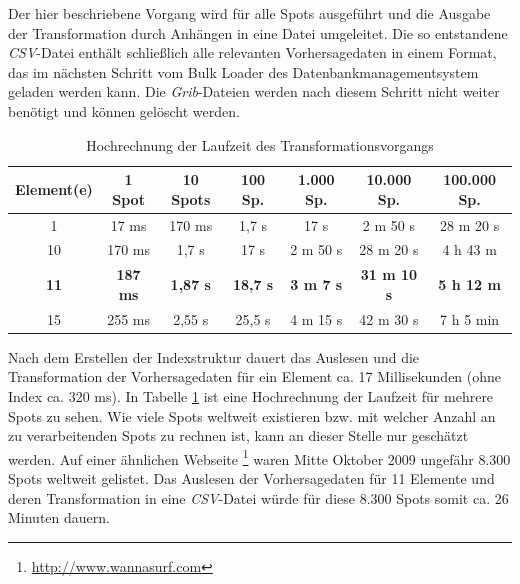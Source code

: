 

Der hier beschriebene Vorgang wird für alle Spots ausgeführt und die
Ausgabe der Transformation durch Anhängen in eine Datei
umgeleitet. Die so entstandene \textit{CSV}-Datei enthält schließlich
alle relevanten Vorhersagedaten in einem Format, das im nächsten
Schritt vom Bulk Loader des Datenbankmanagementsystem geladen werden
kann. Die \textit{Grib}-Dateien werden nach diesem Schritt nicht
weiter benötigt und können gelöscht werden.
\begin{table}[h]
  \centering
  {\sf
    \footnotesize
    \begin{longtable}{c|c|c|c|c|c|c}

      \toprule
      \textbf{Element(e)} & \textbf{1 Spot} & \textbf{10 Spots} & \textbf{100 Sp.} & \textbf{1.000 Sp.} & \textbf{10.000 Sp.} & \textbf{100.000 Sp.} \\
      \midrule
      1 & 17 ms & 170 ms & 1,7 s & 17 s & 2 m 50 s & 28 m 20 s \\
      10 & 170 ms & 1,7 s & 17 s & 2 m 50 s & 28 m 20 s & 4 h 43 m \\
      \textbf{11} & \textbf{187 ms} &  \textbf{1,87 s} & \textbf{18,7 s} & \textbf{3 m 7 s} & \textbf{31 m 10 s} & \textbf{5 h 12 m} \\
      15 & 255 ms & 2,55 s & 25,5 s & 4 m 15 s & 42 m 30 s &  7 h 5 min\\
      \bottomrule
    \end{longtable}
  }

  \caption{Hochrechnung der Laufzeit des Transformationsvorgangs}
  \label{tab:transformation_laufzeit}

\end{table}

Nach dem Erstellen der Indexstruktur dauert das Auslesen und die
Transformation der Vorhersagedaten für ein Element ca. 17
Millisekunden (ohne Index ca. 320 ms). In Tabelle
\ref{tab:transformation_laufzeit} ist eine Hochrechnung der Laufzeit
für mehrere Spots zu sehen. Wie viele Spots weltweit existieren
bzw. mit welcher Anzahl an zu verarbeitenden Spots zu rechnen ist,
kann an dieser Stelle nur geschätzt werden. Auf einer ähnlichen
Webseite \footnote{\url{http://www.wannasurf.com}} waren Mitte Oktober
2009 ungefähr 8.300 Spots weltweit gelistet. Das Auslesen der
Vorhersagedaten für 11 Elemente und deren Transformation in eine
\textit{CSV}-Datei würde für diese 8.300 Spots somit ca. 26 Minuten
dauern.

